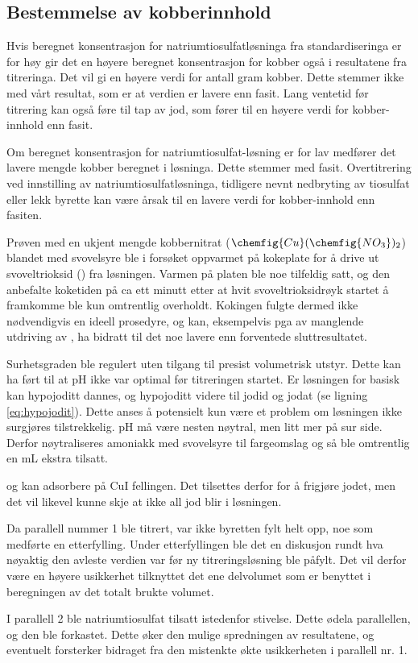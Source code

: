 \subsection{Bestemmelse av kobberinnhold}
Hvis beregnet konsentrasjon for natriumtiosulfatløsninga fra standardiseringa er for høy gir det en høyere beregnet konsentrasjon for kobber også i resultatene fra titreringa. Det vil gi en høyere verdi for antall gram kobber. Dette stemmer ikke med vårt resultat, som er at verdien er lavere enn fasit. Lang ventetid før titrering kan også føre til tap av jod, som fører til en høyere verdi for kobber-innhold enn fasit.

Om beregnet konsentrasjon for natriumtiosulfat-løsning er for lav medfører det lavere mengde kobber beregnet i løsninga. Dette stemmer med fasit. Overtitrering ved innstilling av natriumtiosulfatløsninga, tidligere nevnt nedbryting av tiosulfat eller lekk byrette kan være årsak til en lavere verdi for kobber-innhold enn fasiten.

Prøven med en ukjent mengde kobbernitrat ($\chemfig{Cu} (\chemfig{NO_3})_2$) blandet med svovelsyre ble i forsøket oppvarmet på kokeplate for å drive ut svoveltrioksid () fra løsningen. Varmen på platen ble noe tilfeldig satt, og den anbefalte koketiden på ca ett minutt etter at hvit svoveltrioksidrøyk startet å framkomme ble kun omtrentlig overholdt. Kokingen fulgte dermed ikke nødvendigvis en ideell prosedyre, og kan, eksempelvis pga av manglende utdriving av , ha bidratt til det noe lavere enn forventede sluttresultatet.


Surhetsgraden ble regulert uten tilgang til presist volumetrisk utstyr. Dette kan ha ført til at pH ikke var optimal før titreringen startet. Er løsningen for basisk kan hypojoditt dannes, og hypojoditt videre til jodid og jodat (se ligning \ref{eq:hypojodit}). Dette anses å potensielt kun være et problem om løsningen ikke surgjøres tilstrekkelig. pH må være nesten nøytral, men litt mer på sur side. Derfor nøytraliseres amoniakk med svovelsyre til fargeomslag og så ble omtrentlig en mL ekstra tilsatt.

 og  kan adsorbere på CuI fellingen. Det tilsettes derfor  for å frigjøre jodet, men det vil likevel kunne skje at ikke all jod blir i løsningen. 

Da parallell nummer 1 ble titrert, var ikke byretten fylt helt opp, noe som medførte en etterfylling. Under etterfyllingen ble det en diskusjon rundt hva nøyaktig den avleste verdien var før ny titreringsløsning ble påfylt. Det vil derfor være en høyere usikkerhet tilknyttet det ene delvolumet som er benyttet i beregningen av det totalt brukte volumet.

I parallell 2 ble natriumtiosulfat tilsatt istedenfor stivelse. Dette ødela parallellen, og den ble forkastet. Dette øker den mulige spredningen av resultatene, og eventuelt forsterker bidraget fra den mistenkte økte usikkerheten i parallell nr. 1.

